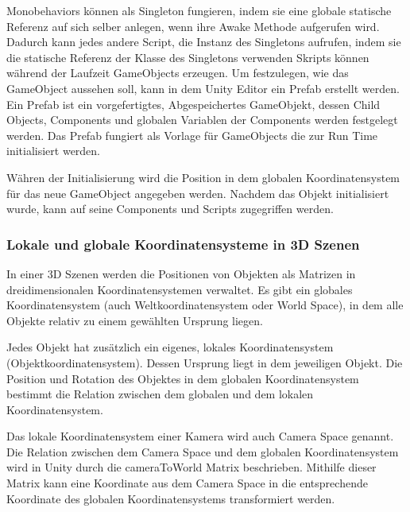 Monobehaviors können als Singleton fungieren, indem sie eine globale statische Referenz auf sich selber anlegen, wenn ihre Awake Methode aufgerufen wird. Dadurch kann jedes andere Script, die Instanz des Singletons aufrufen, indem sie die statische Referenz der Klasse des Singletons verwenden %
Skripts können während der Laufzeit GameObjects erzeugen. Um festzulegen, wie das GameObject aussehen soll, kann in dem Unity Editor ein Prefab erstellt werden. Ein Prefab ist ein vorgefertigtes, Abgespeichertes GameObjekt, dessen Child Objects, Components und globalen Variablen der Components werden festgelegt werden. Das Prefab fungiert als Vorlage für GameObjects die zur Run Time initialisiert werden.

Währen der Initialisierung wird die Position in dem globalen Koordinatensystem für das neue GameObject angegeben werden. Nachdem das Objekt initialisiert wurde, kann auf seine Components und Scripts zugegriffen werden.\citep{unityprefabs}


\subsubsection{Lokale und globale Koordinatensysteme in 3D Szenen}
In einer 3D Szenen werden die Positionen von Objekten als Matrizen in dreidimensionalen Koordinatensystemen verwaltet.
Es gibt ein globales Koordinatensystem (auch Weltkoordinatensystem oder World Space), in dem alle Objekte relativ zu einem gewählten Ursprung liegen. 

Jedes Objekt hat zusätzlich ein eigenes, lokales Koordinatensystem (Objektkoordinatensystem). Dessen Ursprung liegt in dem jeweiligen Objekt.
Die Position und Rotation des Objektes in dem globalen Koordinatensystem bestimmt die Relation zwischen dem globalen und dem lokalen Koordinatensystem. 

Das lokale Koordinatensystem einer Kamera wird auch Camera Space genannt. Die Relation zwischen dem Camera Space und dem globalen Koordinatensystem wird in Unity durch die cameraToWorld Matrix beschrieben. Mithilfe dieser Matrix kann eine Koordinate aus dem Camera Space in die entsprechende Koordinate des globalen Koordinatensystems transformiert werden.\citep{unitycameratoworldmatrix}

